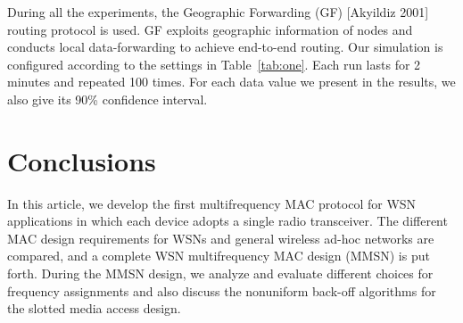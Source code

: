During all the experiments, the Geographic Forwarding (GF)
[Akyildiz 2001] routing protocol is used. GF exploits geographic
information of nodes and conducts local data-forwarding to achieve
end-to-end routing. Our simulation is
configured according to the settings in
Table~\ref{tab:one}. Each run lasts for 2 minutes and
repeated 100 times. For each data value we present in the results,
we also give its 90\% confidence interval.
\begin{table}%
  \begin{tabnote}%
    \vskip2pt
  \end{tabnote}
\end{table}%

\section{Conclusions}

In this article, we develop the first multifrequency MAC protocol for
WSN applications in which each device adopts a
single radio transceiver. The different MAC design requirements for
WSNs and general wireless ad-hoc networks are
compared, and a complete WSN multifrequency MAC design (MMSN) is
put forth. During the MMSN design, we analyze and evaluate different
choices for frequency assignments and also discuss the nonuniform
back-off algorithms for the slotted media access design.

